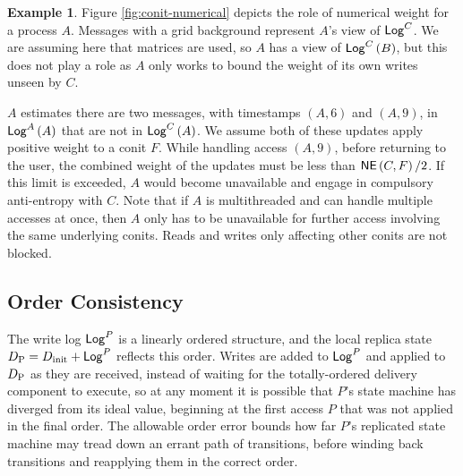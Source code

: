 \documentclass[]             %
{NASA}                       %
\theoremstyle{definition}
\newtheorem{example}[theorem]{Example}
\begin{document}
\begin{example}
  \label{ex:conit-numerical}
  Figure \ref{fig:conit-numerical} depicts the role of numerical
  weight for a process $A$.  Messages with a grid background represent
  $A$'s view of $\mathsf{Log}^{C}$. We are assuming here that matrices are used,
  so $A$ has a view of $\mathsf{Log}^{C}\left(B\right)$, but this does not play a role as
  $A$ only works to bound the weight of its own writes unseen by $C$.

  $A$ estimates there are two messages, with timestamps $(A, 6)$ and
  $(A, 9)$, in $\mathsf{Log}^{A}\left(A\right)$ that are not in $\mathsf{Log}^{C}\left(A\right)$. We assume
  both of these updates apply positive weight to a conit $F$. While
  handling access $(A, 9)$, before returning to the user, the combined
  weight of the updates must be less than
  \mbox{$\mathsf{NE}\left(C, F \right)/ 2$}. If this limit is exceeded, $A$
  would become unavailable and engage in compulsory anti-entropy with
  $C$. Note that if $A$ is multithreaded and can handle multiple
  accesses at once, then $A$ only has to be unavailable for further
  access involving the same underlying conits. Reads and writes only
  affecting other conits are not blocked.
\end{example}

\subsection{Order Consistency}
\label{ssec:conit-order-consistency}
The write log $\mathsf{Log}^{P}$ is a linearly ordered structure, and the local
replica state $D_{\textrm{P}} = D_\textrm{init} + \mathsf{Log}^{P}$ reflects this order. Writes are
added to $\mathsf{Log}^{P}$ and applied to $D_{\textrm{P}}$ as they are received, instead
of waiting for the totally-ordered delivery component to execute, so
at any moment it is possible that $P$'s state machine has diverged
from its ideal value, beginning at the first access $P$ that was not
applied in the final order. The allowable order error bounds how far
$P$'s replicated state machine may tread down an errant path of
transitions, before winding back transitions and reapplying them in
the correct order.

\end{document}
